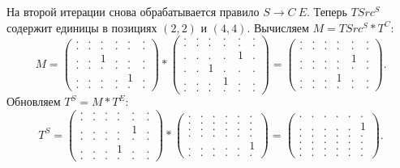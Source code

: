 На второй итерации снова обрабатывается правило $S \to C\ E$.
Теперь $TSrc^S$ содержит единицы в позициях $(2,2)$ и $(4,4)$.
Вычисляем $M = TSrc^S * T^C$:
{
    \renewcommand{\arraystretch}{0.7}
    \setlength\arraycolsep{2pt}
\[
    M =
    \begin{pmatrix}
    . & . & . & . & . & . \\
    . & . & . & . & . & . \\
    . & . & 1 & . & . & . \\
    . & . & . & . & . & . \\
    . & . & . & . & 1 & . \\
    . & . & . & . & . & .
    \end{pmatrix} *
    \begin{pmatrix}
    . & . & . & . & . & . \\
    . & . & . & . & . & . \\
    . & . & . & . & 1 & . \\
    . & . & 1 & . & . & . \\
    . & . & . & 1 & . & . \\
    . & . & . & . & . & .
    \end{pmatrix} =
    \begin{pmatrix}
    . & . & . & . & . & . \\
    . & . & . & . & . & . \\
    . & . & . & . & 1 & . \\
    . & . & . & . & . & . \\
    . & . & . & 1 & . & . \\
    . & . & . & . & . & .
    \end{pmatrix}.
\]
}
Обновляем $T^S = M * T^E$:
{
    \renewcommand{\arraystretch}{0.7}
    \setlength\arraycolsep{2pt}
\[
    T^S =
    \begin{pmatrix}
    . & . & . & . & . & . \\
    . & . & . & . & . & . \\
    . & . & . & . & 1 & . \\
    . & . & . & . & . & . \\
    . & . & . & 1 & . & . \\
    . & . & . & . & . & .
    \end{pmatrix} *
    \begin{pmatrix}
    . & . & . & . & . & . \\
    . & . & . & . & . & . \\
    . & . & . & . & . & . \\
    . & . & . & . & . & . \\
    . & . & . & . & . & 1 \\
    . & . & . & . & . & .
    \end{pmatrix} =
    \begin{pmatrix}
    . & . & . & . & . & . \\
    . & . & . & . & . & 1 \\
    . & . & . & . & . & . \\
    . & . & . & . & . & . \\
    . & . & . & . & . & . \\
    . & . & . & . & . & .
    \end{pmatrix}.
\]
}
